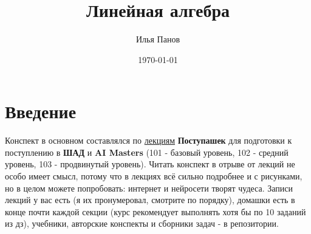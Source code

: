 \documentclass[12pt]{article}
\title{\textbf{\Huge Линейная алгебра}\\}
\author{Илья Панов}
\date{\today}
\begin{document}
\maketitle
\tableofcontents
\newpage







\section{Введение}

Конспект в основном составлялся по \href{https://drive.google.com/drive/folders/1gqBksrkU89tgdOTuxG6GgE3jnozzafNv?usp=sharing}{лекциям} \textbf{Поступашек} для подготовки к поступлению в \textbf{ШАД} и \textbf{AI Masters} (101 - базовый уровень, 102 - средний уровень, 103 - продвинутый уровень). Читать конспект в отрыве от лекций не особо имеет смысл, потому что в лекциях всё сильно подробнее и с рисунками, но в целом можете попробовать: интернет и нейросети творят чудеса. Записи лекций у вас есть (я их пронумеровал, смотрите по порядку), домашки есть в конце почти каждой секции (курс рекомендует выполнять хотя бы по 10 заданий из дз), учебники, авторские конспекты и сборники задач - в репозитории.
\end{document}
